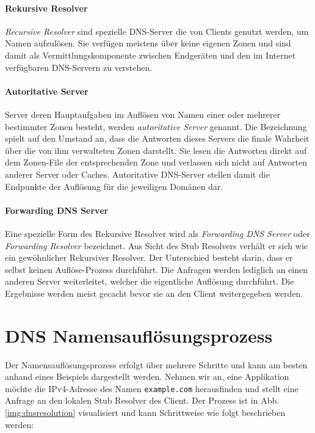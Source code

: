 \paragraph{Rekursive Resolver}
\textit{Recursive Resolver} sind spezielle DNS-Server die von Clients genutzt werden, um Namen aufzulösen. Sie verfügen meistens über keine eigenen Zonen und sind damit als Vermittlungskomponente zwischen Endgeräten und den im Internet verfügbaren DNS-Servern zu verstehen.

\paragraph{Autoritative Server}
Server deren Hauptaufgaben im Auflösen von Namen einer oder mehrerer bestimmter Zonen besteht, werden \textit{autoritative Server} genannt. Die Bezeichnung spielt auf den Umstand an, dass die Antworten dieses Servers die finale Wahrheit über die von ihm verwalteten Zonen darstellt. Sie lesen die Antworten direkt auf dem Zonen-File der entsprechenden Zone und verlassen sich nicht auf Antworten anderer Server oder Caches. Autoritative DNS-Server stellen damit die Endpunkte der Auflösung für die jeweiligen Domänen dar.

\paragraph{Forwarding DNS Server}
Eine spezielle Form des Rekursive Resolver wird als \textit{Forwarding DNS Server} oder \textit{Forwarding Resolver} bezeichnet. Aus Sicht des Stub Resolvers verhält er sich wie ein gewöhnlicher Rekursiver Resolver. Der Unterschied besteht darin, dass er selbst keinen Auflöse-Prozess durchführt. Die Anfragen werden lediglich an einen anderen Server weiterleitet, welcher die eigentliche Auflösung durchführt. Die Ergebnisse werden meist gecacht bevor sie an den Client weitergegeben werden.

\section{DNS Namensauflösungsprozess}
\label{sec:dnsresolution}
Der Namensauflösungsprozess erfolgt über mehrere Schritte und kann am besten anhand eines Beispiels dargestellt werden. Nehmen wir an, eine Applikation möchte die IPv4-Adresse des Namen \texttt{example.com} herausfinden und stellt eine Anfrage an den lokalen Stub Resolver des Client. Der Prozess ist in Abb. \ref{img:dnsresolution} visualisiert und kann Schrittweise wie folgt beschrieben werden:

